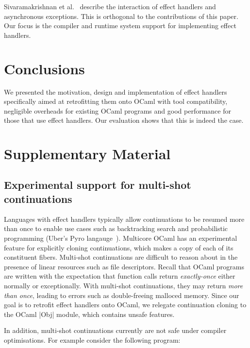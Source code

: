 \documentclass[sigplan,10pt,review,anonymous]{acmart}\settopmatter{printfolios=true,printccs=false,printacmref=false}
\begin{document}
Sivaramakrishnan et al.~\cite{TFP17} describe the interaction of effect
handlers and asynchronous exceptions. This is orthogonal to the contributions
of this paper. Our focus is the compiler and runtime system support for
implementing effect handlers.

\section{Conclusions}
\label{sec:conc}

We presented the motivation, design and implementation of effect handlers
specifically aimed at retrofitting them onto OCaml with tool compatibility,
negligible overheads for existing OCaml programs and good performance for those
that use effect handlers. Our evaluation shows that this is indeed the case.

\clearpage




\clearpage

\section*{Supplementary Material}
\setcounter{figure}{0}

\subsection*{Experimental support for multi-shot continuations}

Languages with effect handlers typically allow continuations to be resumed more
than once to enable use cases such as backtracking search and probabilistic
programming (Uber's Pyro langauge~\cite{Pyro}). Multicore OCaml has an
experimental feature for explicitly cloning continuations, which makes a copy
of each of its constituent fibers. Multi-shot continuations are difficult to
reason about in the presence of linear resources such as file descriptors.
Recall that OCaml programs are written with the expectation that function calls
return \emph{exactly-once} either normally or exceptionally. With multi-shot
continuations, they may return \emph{more than once}, leading to errors such as
double-freeing malloced memory. Since our goal is to retrofit effect handlers
onto OCaml, we relegate continuation cloning to the OCaml |Obj| module, which
contains unsafe features.

In addition, multi-shot continuations currently are not safe under compiler
optimisations. For example consider the following program:
\end{document}
